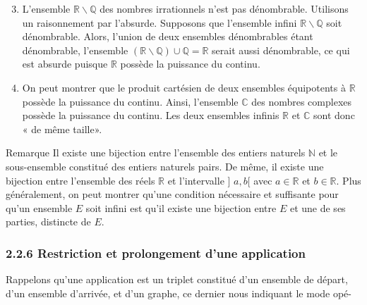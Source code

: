 \documentclass[10pt]{book}
\begin{document}
\begin{enumerate}
  \setcounter{enumi}{2}
  \item L'ensemble $\mathbb{R} \backslash \mathbb{Q}$ des nombres irrationnels n'est pas dénombrable. Utilisons un raisonnement par l'absurde. Supposons que l'ensemble infini $\mathbb{R} \backslash \mathbb{Q}$ soit dénombrable. Alors, l'union de deux ensembles dénombrables étant dénombrable, l'ensemble $(\mathbb{R} \backslash \mathbb{Q}) \cup \mathbb{Q}=\mathbb{R}$ serait aussi dénombrable, ce qui est absurde puisque $\mathbb{R}$ possède la puissance du continu.

  \item On peut montrer que le produit cartésien de deux ensembles équipotents à $\mathbb{R}$ possède la puissance du continu. Ainsi, l'ensemble $\mathbb{C}$ des nombres complexes possède la puissance du continu. Les deux ensembles infinis $\mathbb{R}$ et $\mathbb{C}$ sont donc « de même taille».

\end{enumerate}
Remarque Il existe une bijection entre l'ensemble des entiers naturels $\mathbb{N}$ et le sous-ensemble constitué des entiers naturels pairs. De même, il existe une bijection entre l'ensemble des réels $\mathbb{R}$ et l'intervalle ] $a, b[$ avec $a \in \mathbb{R}$ et $b \in \mathbb{R}$. Plus généralement, on peut montrer qu'une condition nécessaire et suffisante pour qu'un ensemble $E$ soit infini est qu'il existe une bijection entre $E$ et une de ses parties, distincte de $E$.

\subsubsection*{\textbf{2.2.6 Restriction et prolongement d'une application}}
Rappelons qu'une application est un triplet constitué d'un ensemble de départ, d'un ensemble d'arrivée, et d'un graphe, ce dernier nous indiquant le mode opé-
\end{document}
